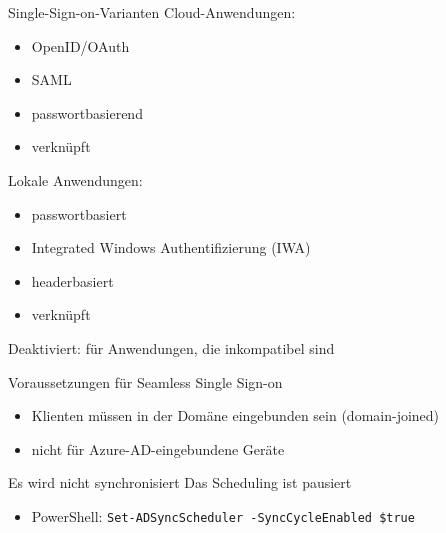 \begin{flashcard}[Definition]{Single-Sign-on-Varianten}
    Cloud-Anwendungen:
    \begin{itemize}
        \item OpenID/OAuth
        \item SAML
        \item passwortbasierend
        \item verknüpft
    \end{itemize}
    Lokale Anwendungen:
    \begin{itemize}
        \item passwortbasiert
        \item Integrated Windows Authentifizierung (IWA)
        \item headerbasiert
        \item verknüpft
    \end{itemize}
    Deaktiviert: für Anwendungen, die inkompatibel sind
\end{flashcard}

\begin{flashcard}[Definition]{Voraussetzungen für Seamless Single Sign-on}
    \begin{itemize}
        \item Klienten müssen in der Domäne eingebunden sein (domain-joined)
        \item[!] nicht für Azure-AD-eingebundene Geräte
    \end{itemize}
\end{flashcard}


\begin{flashcard}[Definition]{Es wird nicht synchronisiert}
    Das Scheduling ist pausiert
    \begin{itemize}
        \item PowerShell:\newline
            \texttt{Set-ADSyncScheduler -SyncCycleEnabled \$true}
    \end{itemize}
\end{flashcard}


